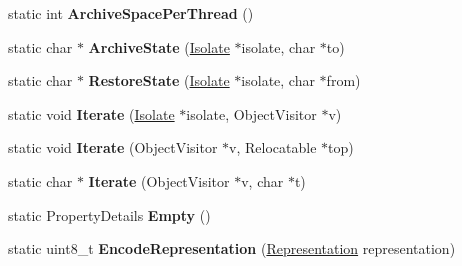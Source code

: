\begin{DoxyCompactItemize}
\item 
static int {\bfseries Archive\+Space\+Per\+Thread} ()\hypertarget{classv8_1_1internal_1_1_b_a_s_e___e_m_b_e_d_d_e_d_a9c3d5ef8f05ba723d17b2410858fca5f}{}\label{classv8_1_1internal_1_1_b_a_s_e___e_m_b_e_d_d_e_d_a9c3d5ef8f05ba723d17b2410858fca5f}

\item 
static char $\ast$ {\bfseries Archive\+State} (\hyperlink{classv8_1_1internal_1_1_isolate}{Isolate} $\ast$isolate, char $\ast$to)\hypertarget{classv8_1_1internal_1_1_b_a_s_e___e_m_b_e_d_d_e_d_a5ff5e310aa5539bedb4f782238b1e77f}{}\label{classv8_1_1internal_1_1_b_a_s_e___e_m_b_e_d_d_e_d_a5ff5e310aa5539bedb4f782238b1e77f}

\item 
static char $\ast$ {\bfseries Restore\+State} (\hyperlink{classv8_1_1internal_1_1_isolate}{Isolate} $\ast$isolate, char $\ast$from)\hypertarget{classv8_1_1internal_1_1_b_a_s_e___e_m_b_e_d_d_e_d_a00adde86f41134b61c68a0896beeb099}{}\label{classv8_1_1internal_1_1_b_a_s_e___e_m_b_e_d_d_e_d_a00adde86f41134b61c68a0896beeb099}

\item 
static void {\bfseries Iterate} (\hyperlink{classv8_1_1internal_1_1_isolate}{Isolate} $\ast$isolate, Object\+Visitor $\ast$v)\hypertarget{classv8_1_1internal_1_1_b_a_s_e___e_m_b_e_d_d_e_d_ac7ed6503858ba2a6551b77abb4b9d299}{}\label{classv8_1_1internal_1_1_b_a_s_e___e_m_b_e_d_d_e_d_ac7ed6503858ba2a6551b77abb4b9d299}

\item 
static void {\bfseries Iterate} (Object\+Visitor $\ast$v, Relocatable $\ast$top)\hypertarget{classv8_1_1internal_1_1_b_a_s_e___e_m_b_e_d_d_e_d_ae2cc8ae59688d768427f28ba1f033f70}{}\label{classv8_1_1internal_1_1_b_a_s_e___e_m_b_e_d_d_e_d_ae2cc8ae59688d768427f28ba1f033f70}

\item 
static char $\ast$ {\bfseries Iterate} (Object\+Visitor $\ast$v, char $\ast$t)\hypertarget{classv8_1_1internal_1_1_b_a_s_e___e_m_b_e_d_d_e_d_a55ec0ee31bafa90c1071543c83216682}{}\label{classv8_1_1internal_1_1_b_a_s_e___e_m_b_e_d_d_e_d_a55ec0ee31bafa90c1071543c83216682}

\item 
static Property\+Details {\bfseries Empty} ()\hypertarget{classv8_1_1internal_1_1_b_a_s_e___e_m_b_e_d_d_e_d_ab071887d6f12d1f583ba93340827e6f5}{}\label{classv8_1_1internal_1_1_b_a_s_e___e_m_b_e_d_d_e_d_ab071887d6f12d1f583ba93340827e6f5}

\item 
static uint8\+\_\+t {\bfseries Encode\+Representation} (\hyperlink{classv8_1_1internal_1_1_representation}{Representation} representation)\hypertarget{classv8_1_1internal_1_1_b_a_s_e___e_m_b_e_d_d_e_d_ae7fcab132e627f365393f2238818bb60}{}\label{classv8_1_1internal_1_1_b_a_s_e___e_m_b_e_d_d_e_d_ae7fcab132e627f365393f2238818bb60}


\end{DoxyCompactItemize}
